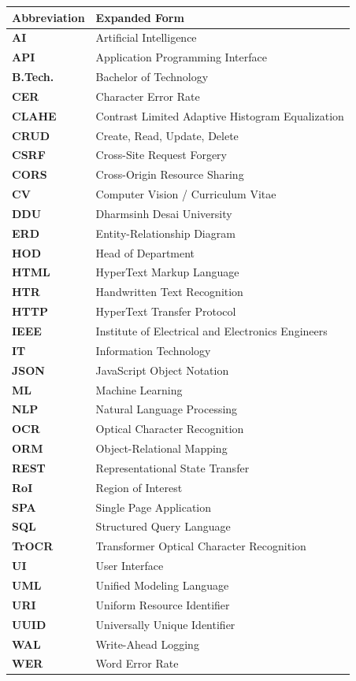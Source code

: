 \documentclass[12pt,letterpaper]{report}
\begin{document}
\begin{longtable}{ll}
\toprule
\textbf{Abbreviation} & \textbf{Expanded Form} \\
\midrule
\endhead
\textbf{AI} & Artificial Intelligence \\
\textbf{API} & Application Programming Interface \\
\textbf{B.Tech.} & Bachelor of Technology \\
\textbf{CER} & Character Error Rate \\
\textbf{CLAHE} & Contrast Limited Adaptive Histogram Equalization \\
\textbf{CRUD} & Create, Read, Update, Delete \\
\textbf{CSRF} & Cross-Site Request Forgery \\
\textbf{CORS} & Cross-Origin Resource Sharing \\
\textbf{CV} & Computer Vision / Curriculum Vitae \\
\textbf{DDU} & Dharmsinh Desai University \\
\textbf{ERD} & Entity-Relationship Diagram \\
\textbf{HOD} & Head of Department \\
\textbf{HTML} & HyperText Markup Language \\
\textbf{HTR} & Handwritten Text Recognition \\
\textbf{HTTP} & HyperText Transfer Protocol \\
\textbf{IEEE} & Institute of Electrical and Electronics Engineers \\
\textbf{IT} & Information Technology \\
\textbf{JSON} & JavaScript Object Notation \\
\textbf{ML} & Machine Learning \\
\textbf{NLP} & Natural Language Processing \\
\textbf{OCR} & Optical Character Recognition \\
\textbf{ORM} & Object-Relational Mapping \\
\textbf{REST} & Representational State Transfer \\
\textbf{RoI} & Region of Interest \\
\textbf{SPA} & Single Page Application \\
\textbf{SQL} & Structured Query Language \\
\textbf{TrOCR} & Transformer Optical Character Recognition \\
\textbf{UI} & User Interface \\
\textbf{UML} & Unified Modeling Language \\
\textbf{URI} & Uniform Resource Identifier \\
\textbf{UUID} & Universally Unique Identifier \\
\textbf{WAL} & Write-Ahead Logging \\
\textbf{WER} & Word Error Rate \\
\bottomrule
\end{longtable}
\end{document}
